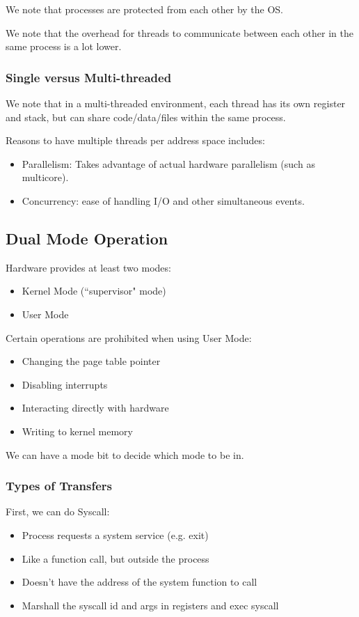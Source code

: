 \documentclass[openany]{book}
\begin{document}
We note that processes are protected from each other by the OS.

We note that the overhead for threads to communicate between each other in the same process is a lot lower.

\subsubsection{Single versus Multi-threaded}
We note that in a multi-threaded environment, each thread has its own register and stack, but can share code/data/files within the same process.

Reasons to have multiple threads per address space includes:
\begin{itemize}
	\item Parallelism: Takes advantage of actual hardware parallelism (such as multicore).
	\item Concurrency: ease of handling I/O and other simultaneous events.
\end{itemize}

\subsection{Dual Mode Operation}
Hardware provides at least two modes:
\begin{itemize}
	\item Kernel Mode (``supervisor" mode)
	\item User Mode
\end{itemize}

Certain operations are prohibited when using User Mode:
\begin{itemize}
	\item Changing the page table pointer
	\item Disabling interrupts
	\item Interacting directly with hardware
	\item Writing to kernel memory
\end{itemize}

We can have a mode bit to decide which mode to be in.


\subsubsection{Types of Transfers}
First, we can do Syscall:
\begin{itemize}
	\item Process requests a system service (e.g. exit)
	\item Like a function call, but outside the process
	\item Doesn't have the address of the system function to call
	\item Marshall the syscall id and args in registers and exec syscall
\end{itemize}
\end{document}
